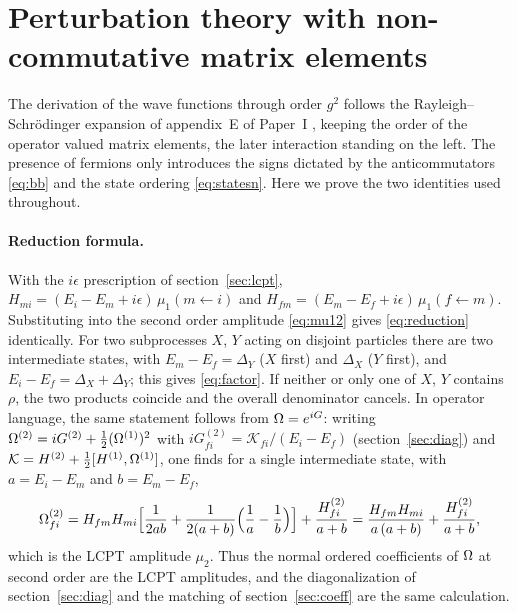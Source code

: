 \section{Perturbation theory with non-commutative matrix elements}
\label{app:pt}

The derivation of the wave functions through order $g^{2}$ follows the Rayleigh--Schr\"odinger
expansion of appendix~E of Paper~I \cite{Landau:1991,Shankar:2012}, keeping the order of the operator
valued matrix elements, the later interaction standing on the left. The presence of fermions only
introduces the signs dictated by the anticommutators \eqref{eq:bb} and the state ordering
\eqref{eq:statesn}. Here we prove the two identities used throughout.

\paragraph{Reduction formula.} With the $i\epsilon$ prescription of section~\ref{sec:lcpt},
$H_{mi}=(E_{i}-E_{m}+i\epsilon)\,\mu_{1}(m\leftarrow i)$ and $H_{fm}=(E_{m}-E_{f}+i\epsilon)\,\mu_{1}(f\leftarrow m)$.
Substituting into the second order amplitude \eqref{eq:mu12} gives \eqref{eq:reduction} identically.
For two subprocesses $X$, $Y$ acting on disjoint particles there are two intermediate states, with
$E_{m}-E_{f}=\Delta_{Y}$ ($X$ first) and $\Delta_{X}$ ($Y$ first), and $E_{i}-E_{f}=\Delta_{X}+\Delta_{Y}$; this
gives \eqref{eq:factor}. If neither or only one of $X$, $Y$ contains $\rho$, the two products coincide and
the overall denominator cancels. In operator language, the same statement follows from
$\Omega=e^{iG}$: writing $\Omega^{(2)}=iG^{(2)}+\tfrac12(\Omega^{(1)})^{2}$ with
$iG^{(2)}_{fi}=\mathcal K_{fi}/(E_{i}-E_{f})$ (section~\ref{sec:diag}) and
$\mathcal K=H^{(2)}+\tfrac12[H^{(1)},\Omega^{(1)}]$, one finds for a single intermediate state, with
$a=E_{i}-E_{m}$ and $b=E_{m}-E_{f}$,
\begin{equation}
\Omega^{(2)}_{fi}=H_{fm}H_{mi}\Big[\frac{1}{2ab}+\frac{1}{2(a+b)}\Big(\frac1a-\frac1b\Big)\Big]
+\frac{H^{(2)}_{fi}}{a+b}
=\frac{H_{fm}H_{mi}}{a\,(a+b)}+\frac{H^{(2)}_{fi}}{a+b},
\end{equation}
which is the LCPT amplitude $\mu_{2}$. Thus the normal ordered coefficients of $\Omega$ at second order are
the LCPT amplitudes, and the diagonalization of section~\ref{sec:diag} and the matching of
section~\ref{sec:coeff} are the same calculation.


